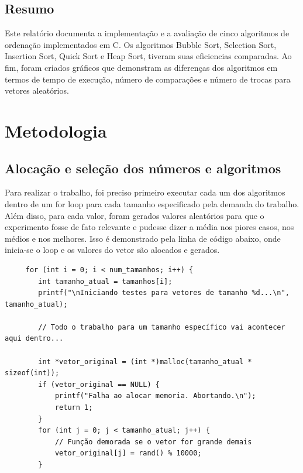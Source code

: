 \documentclass[a4paper]{article}
\begin{document}
    \renewcommand{\contentsname}{SUMÁRIO}
    \tableofcontents
    \newpage

    \subsection{Resumo}\label{subsec:resumo}
    Este relatório documenta a implementação e a avaliação de cinco algoritmos de ordenação implementados em C. Os algoritmos Bubble Sort, Selection Sort, Insertion Sort, Quick Sort e Heap Sort, tiveram suas eficiencias comparadas. Ao fim, foram criados gráficos que
    demonstram as diferenças dos algoritmos em termos de tempo de execução, número de comparações e número de trocas para vetores aleatórios.


    \section{Metodologia}\label{sec:metodologia}
    \subsection{Alocação e seleção dos números e algoritmos}\label{subsec:alocacao-e-selecao-dos-numeros}
    Para realizar o trabalho, foi preciso primeiro executar cada um dos algoritmos dentro de um for loop para cada tamanho especificado pela demanda do trabalho.
    Além disso, para cada valor, foram gerados valores aleatórios para que o experimento fosse de fato relevante e pudesse dizer a média nos piores casos, nos médios e nos melhores.
    Isso é demonstrado pela linha de código abaixo, onde inicia-se o loop e os valores do vetor são alocados e gerados.
    \begin{verbatim}
     for (int i = 0; i < num_tamanhos; i++) {
        int tamanho_atual = tamanhos[i];
        printf("\nIniciando testes para vetores de tamanho %d...\n", tamanho_atual);

        // Todo o trabalho para um tamanho específico vai acontecer aqui dentro...

        int *vetor_original = (int *)malloc(tamanho_atual * sizeof(int));
        if (vetor_original == NULL) {
            printf("Falha ao alocar memoria. Abortando.\n");
            return 1;
        }
        for (int j = 0; j < tamanho_atual; j++) {
            // Função demorada se o vetor for grande demais
            vetor_original[j] = rand() % 10000;
        }
    \end{verbatim}
\end{document}
